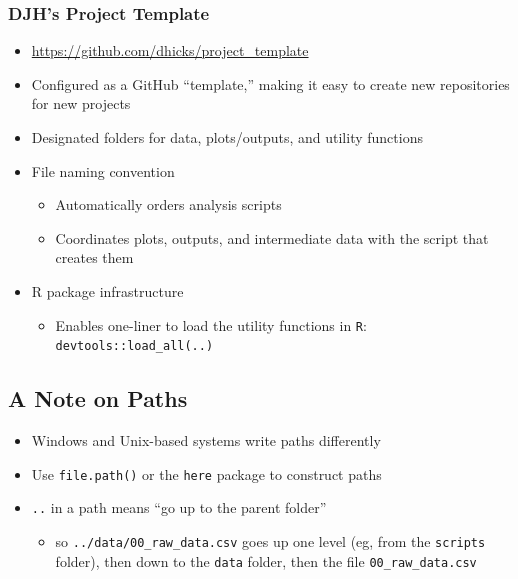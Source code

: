 \documentclass[
]{article}
\providecommand{\tightlist}{%
  \setlength{\itemsep}{0pt}\setlength{\parskip}{0pt}}
\begin{document}
\hypertarget{djhs-project-template}{%
\subsubsection{DJH's Project Template}\label{djhs-project-template}}

\begin{itemize}
\item
  \url{https://github.com/dhicks/project_template}
\item
  Configured as a GitHub ``template,'' making it easy to create new repositories for new projects
\item
  Designated folders for data, plots/outputs, and utility functions
\item
  File naming convention

  \begin{itemize}
  \tightlist
  \item
    Automatically orders analysis scripts
  \item
    Coordinates plots, outputs, and intermediate data with the script that creates them
  \end{itemize}
\item
  R package infrastructure

  \begin{itemize}
  \tightlist
  \item
    Enables one-liner to load the utility functions in \texttt{R}: \texttt{devtools::load\_all(\textquotesingle{}..\textquotesingle{})}
  \end{itemize}
\end{itemize}

\hypertarget{a-note-on-paths}{%
\subsection{A Note on Paths}\label{a-note-on-paths}}

\begin{itemize}
\tightlist
\item
  Windows and Unix-based systems write paths differently
\item
  Use \texttt{file.path()} or the \texttt{here} package to construct paths
\item
  \texttt{..} in a path means ``go up to the parent folder''

  \begin{itemize}
  \tightlist
  \item
    so \texttt{../data/00\_raw\_data.csv} goes up one level (eg, from the \texttt{scripts} folder), then down to the \texttt{data} folder, then the file \texttt{00\_raw\_data.csv}
  \end{itemize}
\end{itemize}
\end{document}

